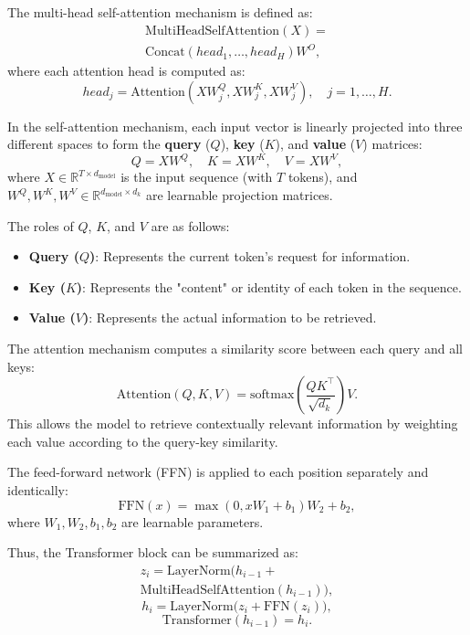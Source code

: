 \documentclass[conference]{IEEEtran}
\begin{document}
The multi-head self-attention mechanism is defined as:
\begin{multline}
\text{MultiHeadSelfAttention}(X) = \\ \text{Concat}(head_1, \dots, head_H)W^O,
\end{multline}
where each attention head is computed as:
\begin{equation}
head_j = \text{Attention}(XW_j^Q, XW_j^K, XW_j^V), \quad j = 1, \dots, H.
\end{equation}

In the self-attention mechanism, each input vector is linearly projected into three different spaces to form the \textbf{query} ($Q$), \textbf{key} ($K$), and \textbf{value} ($V$) matrices:
\begin{equation}\label{eq:at}
Q = XW^Q, \quad K = XW^K, \quad V = XW^V,
\end{equation}
where $X \in \mathbb{R}^{T \times d_{\text{model}}}$ is the input sequence (with $T$ tokens), and $W^Q, W^K, W^V \in \mathbb{R}^{d_{\text{model}} \times d_k}$ are learnable projection matrices.

The roles of $Q$, $K$, and $V$ are as follows:
\begin{itemize}
  \item \textbf{Query ($Q$)}: Represents the current token's request for information.
  \item \textbf{Key ($K$)}: Represents the "content" or identity of each token in the sequence.
  \item \textbf{Value ($V$)}: Represents the actual information to be retrieved.
\end{itemize}

The attention mechanism computes a similarity score between each query and all keys:
\begin{equation}
\text{Attention}(Q, K, V) = \text{softmax}\left( \frac{QK^\top}{\sqrt{d_k}} \right) V.
\end{equation}
This allows the model to retrieve contextually relevant information by weighting each value according to the query-key similarity.


The feed-forward network (FFN) is applied to each position separately and identically:
\begin{equation}
\text{FFN}(x) = \max(0, xW_1 + b_1)W_2 + b_2,
\end{equation}
where $W_1, W_2, b_1, b_2$ are learnable parameters.

Thus, the Transformer block can be summarized as:
\begin{multline}
z_i = \mathrm{LayerNorm}\big(h_{i-1} + \\ \mathrm{MultiHeadSelfAttention}(h_{i-1})\big), 
\end{multline}
\begin{equation}
h_i = \mathrm{LayerNorm}\big(z_i + \mathrm{FFN}(z_i)\big), 
\end{equation}
\begin{equation}
\text{Transformer}(h_{i-1}) = h_i.
\end{equation}
\end{document}
